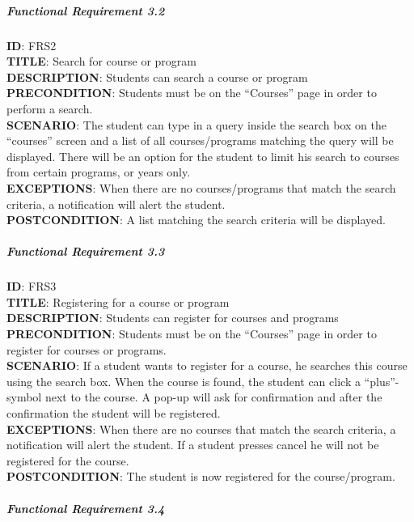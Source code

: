 \documentclass[9pt]{article}
\begin{document}
\subparagraph{Functional Requirement
3.2}\label{functional-requirement-3.2}

\textbf{ID}: FRS2\\\textbf{TITLE}: Search for course or
program\\\textbf{DESCRIPTION}: Students can search a course or
program\\\textbf{PRECONDITION}: Students must be on the ``Courses'' page
in order to perform a search.\\\textbf{SCENARIO}: The student can type
in a query inside the search box on the ``courses'' screen and a list of
all courses/programs matching the query will be displayed. There will be
an option for the student to limit his search to courses from certain
programs, or years only.\\\textbf{EXCEPTIONS}: When there are no
courses/programs that match the search criteria, a notification will
alert the student.\\\textbf{POSTCONDITION}: A list matching the search
criteria will be displayed.

\subparagraph{Functional Requirement
3.3}\label{functional-requirement-3.3}

\textbf{ID}: FRS3\\\textbf{TITLE}: Registering for a course or
program\\\textbf{DESCRIPTION}: Students can register for courses and
programs\\\textbf{PRECONDITION}: Students must be on the ``Courses''
page in order to register for courses or programs.\\\textbf{SCENARIO}:
If a student wants to register for a course, he searches this course
using the search box. When the course is found, the student can click a
``plus''-symbol next to the course. A pop-up will ask for confirmation
and after the confirmation the student will be
registered.\\\textbf{EXCEPTIONS}: When there are no courses that match
the search criteria, a notification will alert the student. If a student
presses cancel he will not be registered for the
course.\\\textbf{POSTCONDITION}: The student is now registered for the
course/program.

\subparagraph{Functional Requirement
3.4}\label{functional-requirement-3.4}
\end{document}
